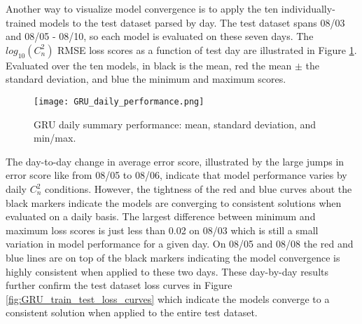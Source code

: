 Another way to visualize model convergence is to apply the ten individually-trained models to the test dataset parsed by day. The test dataset spans 08/03 and 08/05 - 08/10, so each model is evaluated on these seven days. The $log_{10}(C_{n}^{2})$ RMSE loss scores as a function of test day are illustrated in Figure \ref{fig:GRU_daily_performance}. Evaluated over the ten models, in black is the mean, red the mean $\pm$ the standard deviation, and blue the minimum and maximum scores.
\begin{figure}[h!]
	\centering
	\texttt{[image: GRU\_daily\_performance.png]}
	\caption{GRU daily summary performance: mean, standard deviation, and min/max.}
	\label{fig:GRU_daily_performance}
\end{figure}
The day-to-day change in average error score, illustrated by the large jumps in error score like from 08/05 to 08/06, indicate that model performance varies by daily $C_{n}^{2}$ conditions. However, the tightness of the red and blue curves about the black markers indicate the models are converging to consistent solutions when evaluated on a daily basis. The largest difference between minimum and maximum loss scores is just less than 0.02 on 08/03 which is still a small variation in model performance for a given day. On 08/05 and 08/08 the red and blue lines are on top of the black markers indicating the model convergence is highly consistent when applied to these two days. These day-by-day results further confirm the test dataset loss curves in Figure \ref{fig:GRU_train_test_loss_curves} which indicate the models converge to a consistent solution when applied to the entire test dataset.

